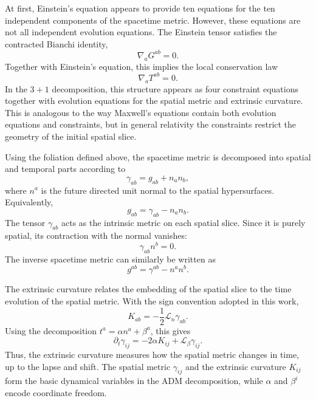 At first, Einstein's equation appears to provide ten equations for the ten independent components of the spacetime metric. However, these equations are not all independent evolution equations. The Einstein tensor satisfies the contracted Bianchi identity,
\begin{equation}
\nabla_a G^{ab} = 0 .
\end{equation}
Together with Einstein's equation, this implies the local conservation law
\begin{equation}
\nabla_a T^{ab} = 0 .
\end{equation}
In the $3+1$ decomposition, this structure appears as four constraint equations together with evolution equations for the spatial metric and extrinsic curvature. This is analogous to the way Maxwell's equations contain both evolution equations and constraints, but in general relativity the constraints restrict the geometry of the initial spatial slice.

Using the foliation defined above, the spacetime metric is decomposed into spatial and temporal parts according to
\begin{equation}
\gamma_{ab} = g_{ab} + n_a n_b ,
\end{equation}
where $n^a$ is the future directed unit normal to the spatial hypersurfaces. Equivalently,
\begin{equation}
g_{ab} = \gamma_{ab} - n_a n_b .
\end{equation}
The tensor $\gamma_{ab}$ acts as the intrinsic metric on each spatial slice. Since it is purely spatial, its contraction with the normal vanishes:
\begin{equation}
\gamma_{ab}n^b = 0 .
\end{equation}
The inverse spacetime metric can similarly be written as
\begin{equation}
g^{ab} = \gamma^{ab} - n^a n^b .
\end{equation}

The extrinsic curvature relates the embedding of the spatial slice to the time evolution of the spatial metric. With the sign convention adopted in this work,
\begin{equation}
K_{ab}
=
-\frac{1}{2}\mathcal{L}_n \gamma_{ab}.
\label{eq:extrinsic-curvature-lie}
\end{equation}
Using the decomposition $t^a=\alpha n^a+\beta^a$, this gives
\begin{equation}
\partial_t \gamma_{ij}
=
-2\alpha K_{ij}
+
\mathcal{L}_{\beta}\gamma_{ij}.
\label{eq:adm-gamma-evolution}
\end{equation}
Thus, the extrinsic curvature measures how the spatial metric changes in time, up to the lapse and shift. The spatial metric $\gamma_{ij}$ and the extrinsic curvature $K_{ij}$ form the basic dynamical variables in the ADM decomposition, while $\alpha$ and $\beta^i$ encode coordinate freedom.

